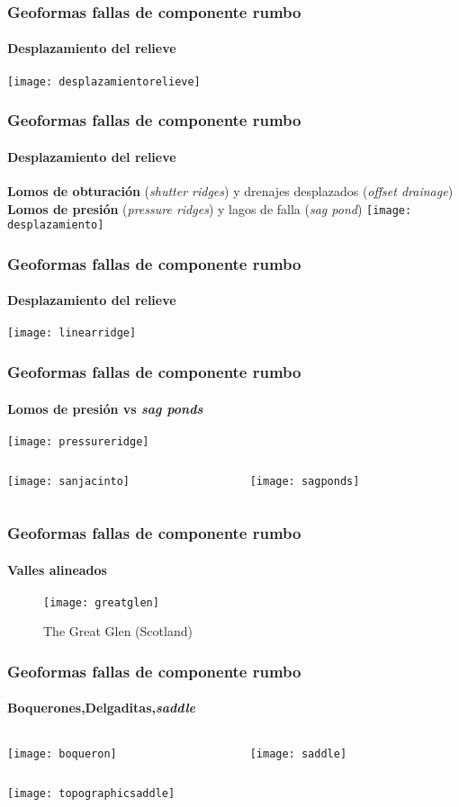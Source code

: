\documentclass{beamer}
\begin{document}
\begin{frame}
\frametitle{Geoformas fallas de componente rumbo}
\framesubtitle{Desplazamiento del relieve}
\centering
\texttt{[image: desplazamientorelieve]}
\end{frame}
\begin{frame}
\frametitle{Geoformas fallas de componente rumbo}
\framesubtitle{Desplazamiento del relieve}
\justifying
\textbf{Lomos de obturación} (\emph{shutter ridges}) y drenajes desplazados (\emph{offset drainage})\vfill
\textbf{Lomos de presión} (\emph{pressure ridges}) y lagos de falla (\emph{sag pond})
\centering
\texttt{[image: desplazamiento]}
\end{frame}
\begin{frame}
\frametitle{Geoformas fallas de componente rumbo}
\framesubtitle{Desplazamiento del relieve}
\centering
\texttt{[image: linearridge]}
\end{frame}
\begin{frame}
\frametitle{Geoformas fallas de componente rumbo}
\framesubtitle{Lomos de presión vs \emph{sag ponds}}
\centering
\texttt{[image: pressureridge]}
\begin{columns}
	\begin{column}{.5\linewidth}
	\texttt{[image: sanjacinto]}
	\end{column}
	\begin{column}{.5\linewidth}
	\texttt{[image: sagponds]}
	\end{column}
\end{columns}
\end{frame}
\begin{frame}
\frametitle{Geoformas fallas de componente rumbo}
\framesubtitle{Valles alineados}
\centering
\begin{figure}
\texttt{[image: greatglen]}
\caption{The Great Glen (Scotland)}
\end{figure}
\end{frame}
\begin{frame}
\frametitle{Geoformas fallas de componente rumbo}
\framesubtitle{Boquerones,Delgaditas,\emph{saddle}}
\begin{columns}
	\begin{column}{.5\linewidth}
	\centering
	\texttt{[image: boqueron]}
	\end{column}
	\begin{column}{.5\linewidth}
	\centering
	\texttt{[image: saddle]}
	\end{column}
\end{columns}
\centering
\texttt{[image: topographicsaddle]}
\end{frame}
\end{document}
